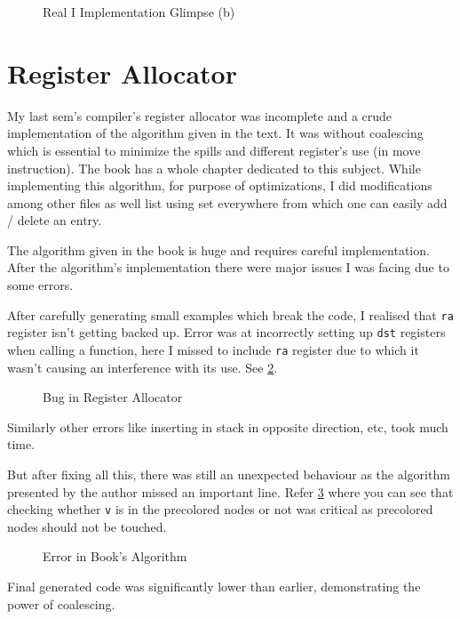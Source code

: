 \begin{figure}
	\centering
	\caption{Real I Implementation Glimpse (b)}
	\label{fig:rphi2}
\end{figure}

\section{Register Allocator}

My last sem's compiler's register allocator was incomplete and a crude implementation of the algorithm given in the text. It was without coalescing which is essential to minimize the spills and different register's use (in move instruction). The book has a whole chapter dedicated to this subject. While implementing this algorithm, for purpose of optimizations, I did modifications among other files as well list using set everywhere from which one can easily add / delete an entry.

The algorithm given in the book is huge and requires careful implementation. After the algorithm's implementation there were major issues I was facing due to some errors.

After carefully generating small examples which break the code, I realised that \texttt{ra} register isn't getting backed up. Error was at incorrectly setting up \texttt{dst} registers when calling a function, here I missed to include \texttt{ra} register due to which it wasn't causing an interference with its use. See \ref{fig:eb}.

\begin{figure}
	\centering
	\caption{Bug in Register Allocator}
	\label{fig:eb}
\end{figure}

Similarly other errors like inserting in stack in opposite direction, etc, took much time.

But after fixing all this, there was still an unexpected behaviour as the algorithm presented by the author missed an important line. Refer \ref{fig:culprit} where you can see that checking whether \texttt{v} is in the precolored nodes or not was critical as precolored nodes should not be touched.

\begin{figure}
	\centering
	\caption{Error in Book's Algorithm}
	\label{fig:culprit}
\end{figure}

Final generated code was significantly lower than earlier, demonstrating the power of coalescing.

